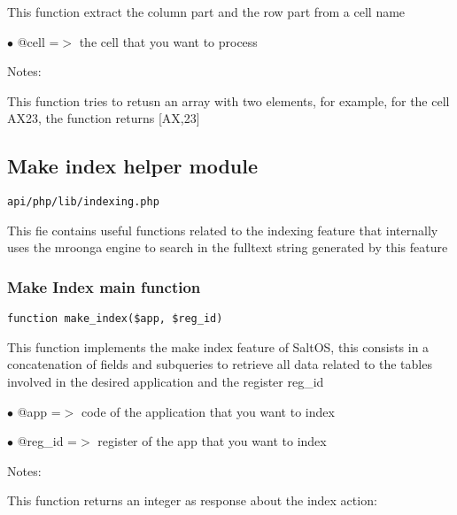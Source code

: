\documentclass[a4paper]{article}
\begin{document}
This function extract the column part and the row part from a cell name

\begin{compactitem}
\item[\color{myblue}$\bullet$] @cell =$>$ the cell that you want to process
\end{compactitem}

Notes:

This function tries to retusn an array with two elements, for example, for
the cell AX23, the function returns [AX,23]

\hypertarget{toc481}{}
\subsection{Make index helper module}

\begin{lstlisting}
api/php/lib/indexing.php
\end{lstlisting}

This fie contains useful functions related to the indexing feature that internally uses the
mroonga engine to search in the fulltext string generated by this feature

\hypertarget{toc482}{}
\subsubsection{Make Index main function}

\begin{lstlisting}
function make_index($app, $reg_id)
\end{lstlisting}

This function implements the make index feature of SaltOS, this consists
in a concatenation of fields and subqueries to retrieve all data related to
the tables involved in the desired application and the register reg\_id

\begin{compactitem}
\item[\color{myblue}$\bullet$] @app    =$>$ code of the application that you want to index
\item[\color{myblue}$\bullet$] @reg\_id =$>$ register of the app that you want to index
\end{compactitem}

Notes:

This function returns an integer as response about the index action:
\end{document}
